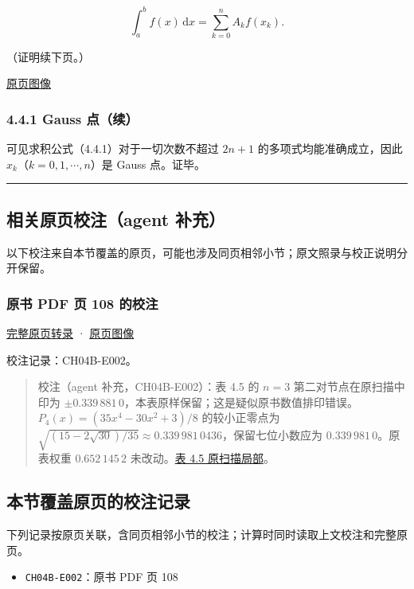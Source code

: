 \documentclass[
  10pt,
  fontset=fandol]{ctexart}
\providecommand{\tightlist}{%
  \setlength{\itemsep}{0pt}\setlength{\parskip}{0pt}}
\begin{document}
\[
\int_a^b f(x)\,\mathrm{d}x=\sum_{k=0}^{n}A_kf(x_k).
\]

（证明续下页。）

\href{../../source-images/pdf-108.jpeg}{原页图像}

\subsubsection{4.4.1 Gauss 点（续）}\label{gauss-ux70b9ux7eed}

可见求积公式（4.4.1）对于一切次数不超过 \(2n+1\) 的多项式均能准确成立，因此 \(x_k\)（\(k=0,1,\cdots,n\)）是 Gauss 点。证毕。

\begin{center}\rule{0.5\linewidth}{0.5pt}\end{center}

\subsection{相关原页校注（agent 补充）}\label{ux76f8ux5173ux539fux9875ux6821ux6ce8agent-ux8865ux5145}

以下校注来自本节覆盖的原页，可能也涉及同页相邻小节；原文照录与校正说明分开保留。

\subsubsection{原书 PDF 页 108 的校注}\label{ux539fux4e66-pdf-ux9875-108-ux7684ux6821ux6ce8}

\href{../pages/pdf-108.md}{完整原页转录} · \href{../../source-images/pdf-108.jpeg}{原页图像}

校注记录：CH04B-E002。

\begin{quote}
校注（agent 补充，CH04B-E002）：表 4.5 的 \(n=3\) 第二对节点在原扫描中印为 \(\pm0.339\,881\,0\)，本表原样保留；这是疑似原书数值排印错误。\(P_4(x)=(35x^4-30x^2+3)/8\) 的较小正零点为 \(\sqrt{(15-2\sqrt{30})/35}\approx0.339\,981\,0436\)，保留七位小数应为 \(0.339\,981\,0\)。原表权重 \(0.652\,145\,2\) 未改动。\href{../assets/ch04b/review-table-4-5.png}{表 4.5 原扫描局部}。
\end{quote}

\subsection{本节覆盖原页的校注记录}\label{ux672cux8282ux8986ux76d6ux539fux9875ux7684ux6821ux6ce8ux8bb0ux5f55}

下列记录按原页关联，含同页相邻小节的校注；计算时同时读取上文校注和完整原页。

\begin{itemize}
\tightlist
\item
  \texttt{CH04B-E002}：原书 PDF 页 108
\end{itemize}
\end{document}
